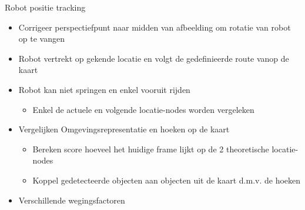 \documentclass[11pt,t]{beamer}
\begin{document}
\begin{frame}[fragile]{Robot positie tracking}
	\begin{itemize}
		\item Corrigeer perspectiefpunt naar midden van afbeelding om rotatie van robot op te vangen
		\item Robot vertrekt op gekende locatie en volgt de gedefinieerde route vanop de kaart
		\item Robot kan niet springen en enkel vooruit rijden
		\begin{itemize}
			\item Enkel de actuele en volgende locatie-nodes worden vergeleken
		\end{itemize}
		
		\item Vergelijken Omgevingsrepresentatie en hoeken op de kaart
		\begin{itemize}
			\item Bereken score hoeveel het huidige frame lijkt op de 2 theoretische locatie-nodes
			\item Koppel gedetecteerde objecten aan objecten uit de kaart d.m.v. de hoeken
		\end{itemize}

		\item Verschillende wegingsfactoren
	\end{itemize}
\end{frame}
\end{document}
